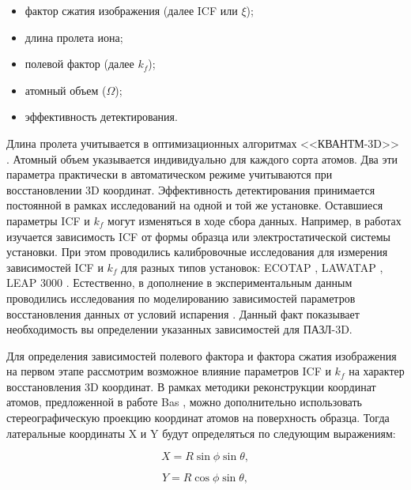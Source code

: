 \begin{itemize}[beginpenalty=10000] %
	\item фактор сжатия изображения (далее ICF или $\xi$);
	\item длина пролета иона;
	\item полевой фактор (далее $k_f$);
	\item атомный объем ($\Omega$);
	\item эффективность детектирования.
\end{itemize}

Длина пролета учитывается в оптимизационных алгоритмах <<КВАНТМ-3D>> \cite{Shutov18,Shutov19}. Атомный объем указывается индивидуально для каждого сорта атомов. Два эти параметра практически в автоматическом режиме учитываются при восстановлении 3D координат. Эффективность детектирования принимается постоянной в рамках исследований на одной и той же установке. Оставшиеся параметры ICF и $k_f$ могут изменяться в ходе сбора данных. Например, в работах \cite{Geiser09,Gipson08} изучается зависимость ICF от формы образца или электростатической системы установки. При этом проводились калибровочные исследования для измерения зависимостей ICF и $k_f$ для разных типов установок: ECOTAP \cite{Geiser09}, LAWATAP \cite{Renaud03}, LEAP 3000 \cite{Renaud06}. Естественно, в дополнение в экспериментальным данным проводились исследования по моделированию зависимостей параметров восстановления данных от условий испарения \cite{Vurpillot11,Miller14,Hatzoglou19}. Данный факт показывает необходимость вы определении указанных зависимостей для ПАЗЛ-3D.


Для определения зависимостей полевого фактора и фактора сжатия изображения на первом этапе рассмотрим возможное влияние параметров ICF и $k_f$ на  характер восстановления 3D координат. В рамках методики реконструкции координат атомов, предложенной в работе Bas \cite{Bas95}, можно дополнительно использовать стереографическую проекцию координат атомов на поверхность образца. Тогда латеральные координаты X и Y будут определяться по следующим выражениям:

\begin{equation}
	\label{eq:equation3_1}
	X = R \sin{\phi}\sin{\theta},	
\end{equation}

\begin{equation}
	\label{eq:equation3_2}
	Y = R \cos{\phi}\sin{\theta},	
\end{equation}

